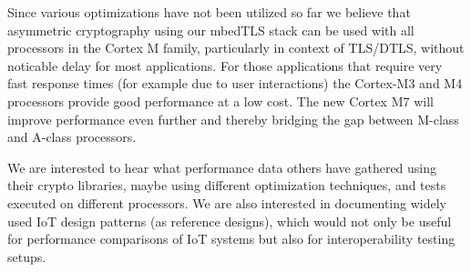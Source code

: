 \documentclass[peerreview, a4paper, draft, 7pt]{IEEEtran}
\begin{document}
Since various optimizations have not been utilized so far we believe that asymmetric cryptography using our mbedTLS stack can be used with all processors in the Cortex M family, particularly in context of TLS/DTLS, without noticable delay for most applications. For those applications that require very fast response times (for example due to user interactions) the Cortex-M3 and M4 processors provide good performance at a low cost. The new Cortex M7 will improve performance even further and thereby bridging the gap between M-class and A-class processors. 

We are interested to hear what performance data others have gathered using their crypto libraries, maybe using different optimization techniques, and tests executed on different processors. We are also interested in documenting widely used IoT design patterns (as reference designs), which would not only be useful for performance comparisons of IoT systems but also for interoperability testing setups. 


% 

\end{document}
